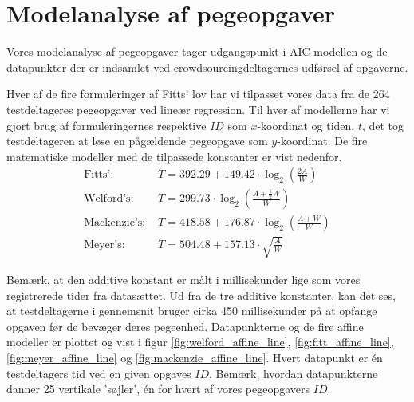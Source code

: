 \begin{minipage}{\linewidth}
\begin{minipage}[t]{.45\linewidth}
		\label{fig:testdeltager7filter}
	\end{minipage}
\end{minipage}

\section*{Modelanalyse af pegeopgaver}
Vores modelanalyse af pegeopgaver tager udgangspunkt i AIC-modellen og de datapunkter der er indsamlet ved crowdsourcingdeltagernes udførsel af opgaverne.

Hver af de fire formuleringer af Fitts' lov har vi tilpasset vores data fra de 264 testdeltageres pegeopgaver ved lineær regression. Til hver af modellerne har vi gjort brug af formuleringernes respektive $ID$ som $x$-koordinat og tiden, $t$, det tog testdeltageren at løse en pågældende pegeopgave som $y$-koordinat. De fire matematiske modeller med de tilpassede konstanter er vist nedenfor.
\begin{align*}
\text{Fitts': } &T = 392.29 + 149.42\cdot \log_2\left(\frac{2A}{W}\right)\\
\text{Welford's: } &T =  299.73\cdot \log_2\left(\frac{A+\frac{1}{2}W}{W}\right)\\
\text{Mackenzie's: } &T = 418.58 + 176.87\cdot \log_2\left(\frac{A+W}{W}\right)\\
\text{Meyer's: } &T = 504.48 + 157.13 \cdot \sqrt{\frac{A}{W}}
\end{align*}

Bemærk, at den additive konstant er målt i millisekunder lige som vores registrerede tider fra datasættet. Ud fra de tre additive konstanter, kan det ses, at testdeltagerne i gennemsnit bruger cirka 450 millisekunder på at opfange opgaven før de bevæger deres pegeenhed. Datapunkterne og de fire affine modeller er plottet og vist i figur \ref{fig:welford_affine_line}, \ref{fig:fitt_affine_line}, \ref{fig:meyer_affine_line} og \ref{fig:mackenzie_affine_line}. Hvert datapunkt er én testdeltagers tid ved en given opgaves $ID$. Bemærk, hvordan datapunkterne danner 25 vertikale 'søjler', én for hvert af vores pegeopgavers $ID$.

